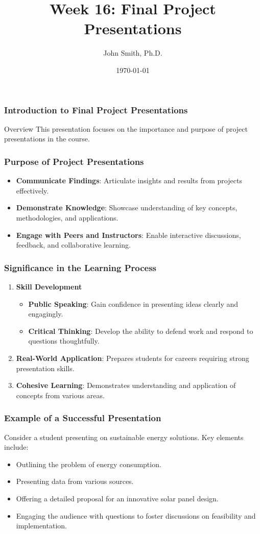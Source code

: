 \documentclass[aspectratio=169]{beamer}
\title[Final Project Presentations]{Week 16: Final Project Presentations}
\author[J. Smith]{John Smith, Ph.D.}
\institute[University Name]{
  Department of Computer Science\\
  University Name\\
  Email: email@university.edu
}
\date{\today}
\begin{document}
\frame{\titlepage}

\begin{frame}[fragile]
    \frametitle{Introduction to Final Project Presentations}
    \begin{block}{Overview}
        This presentation focuses on the importance and purpose of project presentations in the course.
    \end{block}
\end{frame}

\begin{frame}[fragile]
    \frametitle{Purpose of Project Presentations}
    \begin{itemize}
        \item \textbf{Communicate Findings}: Articulate insights and results from projects effectively.
        \item \textbf{Demonstrate Knowledge}: Showcase understanding of key concepts, methodologies, and applications.
        \item \textbf{Engage with Peers and Instructors}: Enable interactive discussions, feedback, and collaborative learning.
    \end{itemize}
\end{frame}

\begin{frame}[fragile]
    \frametitle{Significance in the Learning Process}
    \begin{enumerate}
        \item \textbf{Skill Development}
            \begin{itemize}
                \item \textbf{Public Speaking}: Gain confidence in presenting ideas clearly and engagingly.
                \item \textbf{Critical Thinking}: Develop the ability to defend work and respond to questions thoughtfully.
            \end{itemize}
        \item \textbf{Real-World Application}: Prepares students for careers requiring strong presentation skills.
        \item \textbf{Cohesive Learning}: Demonstrates understanding and application of concepts from various areas.
    \end{enumerate}
\end{frame}

\begin{frame}[fragile]
    \frametitle{Example of a Successful Presentation}
    Consider a student presenting on sustainable energy solutions. Key elements include:
    \begin{itemize}
        \item Outlining the problem of energy consumption.
        \item Presenting data from various sources.
        \item Offering a detailed proposal for an innovative solar panel design.
        \item Engaging the audience with questions to foster discussions on feasibility and implementation.
    \end{itemize}
\end{frame}
\end{document}
